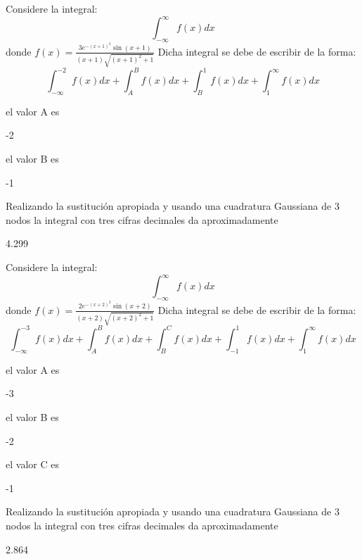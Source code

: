 \documentclass{article}
\begin{document}
\begin{quiz}{}
\begin{cloze}{}
\begin{numerical}[points=18]{}
	\end{numerical}
\end{cloze}
\begin{cloze}{}
	Considere la integral:
	\[\displaystyle\int_{-\infty}^{\infty}f(x)dx\]
	donde $f(x) = \displaystyle\frac{3e^{-(x+1)^2}\sin(x+1)}{(x+1)\sqrt{(x+1)^2+1}}$
	Dicha integral se debe de escribir de la forma:
	\[\displaystyle\int_{-\infty}^{-2}f(x)dx + \displaystyle\int_{A}^{B}f(x)dx+\displaystyle\int_{B}^{1}f(x)dx+ \displaystyle\int_{1}^{\infty}f(x)dx\]
	\begin{numerical}[points=8]{}
		el valor A es \item -2
	\end{numerical}
	\begin{numerical}[points=7]{}
		el valor B es \item -1
	\end{numerical}
	\begin{numerical}[points=18]{}
		Realizando la sustituci\'on apropiada y usando una cuadratura Gaussiana de 3 nodos la integral con tres cifras decimales da aproximadamente \item[tolerance=0.003] 4.299
	\end{numerical}
\end{cloze}
\begin{cloze}{}
	Considere la integral:
	\[\displaystyle\int_{-\infty}^{\infty}f(x)dx\]
	donde $f(x) = \displaystyle\frac{2e^{-(x+2)^2}\sin(x+2)}{(x+2)\sqrt{(x+2)^2+1}}$
	Dicha integral se debe de escribir de la forma:
	\[\displaystyle\int_{-\infty}^{-3}f(x)dx + \displaystyle\int_{A}^{B}f(x)dx+\displaystyle\int_{B}^{C}f(x)dx+ \displaystyle\int_{-1}^{1}f(x)dx+ \displaystyle\int_{1}^{\infty}f(x)dx\]
	\begin{numerical}[points=5]{}
		el valor A es \item -3
	\end{numerical}
	\begin{numerical}[points=5]{}
		el valor B es \item -2
	\end{numerical}
	\begin{numerical}[points=5]{}
		el valor C es \item -1
	\end{numerical}
	\begin{numerical}[points=18]{}
		Realizando la sustituci\'on apropiada y usando una cuadratura Gaussiana de 3 nodos la integral con tres cifras decimales da aproximadamente \item[tolerance=0.003] 2.864
	\end{numerical}

\end{cloze}
\end{quiz}
\end{document}
